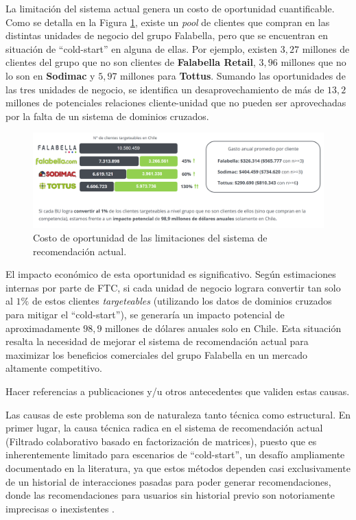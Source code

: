 La limitación del sistema actual genera un costo de oportunidad cuantificable. Como se detalla en la Figura \ref{fig:Limitaciones_Sistema_Actual}, existe un \textit{pool} de clientes que compran en las distintas unidades de negocio del grupo Falabella, pero que se encuentran en situación de \enquote{cold-start} en alguna de ellas. Por ejemplo, existen $3,27$ millones de clientes del grupo que no son clientes de \textbf{Falabella Retail}, $3,96$ millones que no lo son en \textbf{Sodimac} y $5,97$ millones para \textbf{Tottus}. Sumando las oportunidades de las tres unidades de negocio, se identifica un desaprovechamiento de más de $13,2$ millones de potenciales relaciones cliente-unidad que no pueden ser aprovechadas por la falta de un sistema de dominios cruzados.

\begin{figure}[th]
	\centering
	\includegraphics[width=\textwidth]{Figures/grafica Matias.png}
	\caption{Costo de oportunidad de las limitaciones del sistema de recomendación actual.}
	\label{fig:Limitaciones_Sistema_Actual}
\end{figure}

El impacto económico de esta oportunidad es significativo. Según estimaciones internas por parte de FTC, si cada unidad de negocio lograra convertir tan solo al $1\%$ de estos clientes \textit{targeteables} (utilizando los datos de dominios cruzados para mitigar el \enquote{cold-start}), se generaría un impacto potencial de aproximadamente $98,9$ millones de dólares anuales solo en Chile. Esta situación resalta la necesidad de mejorar el sistema de recomendación actual para maximizar los beneficios comerciales del grupo Falabella en un mercado altamente competitivo.

Hacer referencias a publicaciones y/u otros antecedentes que validen estas causas.

Las causas de este problema son de naturaleza tanto técnica como estructural. En primer lugar, la causa técnica radica en el sistema de recomendación actual (Filtrado colaborativo basado en factorización de matrices), puesto que es inherentemente limitado para escenarios de \enquote{cold-start}, un desafío ampliamente documentado en la literatura, ya que estos métodos dependen casi exclusivamente de un historial de interacciones pasadas para poder generar recomendaciones, donde las recomendaciones para usuarios sin historial previo son notoriamente imprecisas o inexistentes \cite{10339320}.

